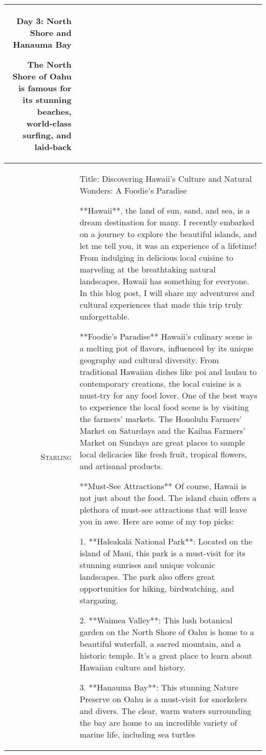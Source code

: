\documentclass{article}
\newlength\mydepth
\newcommand{\starlingemojititle}{\textsc{Starling}\raisebox{-\mydepth}{\texttt{[image: images/starling-final.png]}}}
\begin{document}
{{\begin{tabularx}{\linewidth}{r X}
Day 3: North Shore and Hanauma Bay

The North Shore of Oahu is famous for its stunning beaches, world-class surfing, and laid-back

\\
 \midrule \starlingemojititle{}  &
Title: Discovering Hawaii's Culture and Natural Wonders: A Foodie's Paradise

**Hawaii**, the land of sun, sand, and sea, is a dream destination for many. I recently embarked on a journey to explore the beautiful islands, and let me tell you, it was an experience of a lifetime! From indulging in delicious local cuisine to marveling at the breathtaking natural landscapes, Hawaii has something for everyone. In this blog post, I will share my adventures and cultural experiences that made this trip truly unforgettable.

**Foodie's Paradise**
Hawaii's culinary scene is a melting pot of flavors, influenced by its unique geography and cultural diversity. From traditional Hawaiian dishes like poi and laulau to contemporary creations, the local cuisine is a must-try for any food lover. One of the best ways to experience the local food scene is by visiting the farmers' markets. The Honolulu Farmers' Market on Saturdays and the Kailua Farmers' Market on Sundays are great places to sample local delicacies like fresh fruit, tropical flowers, and artisanal products.

**Must-See Attractions**
Of course, Hawaii is not just about the food. The island chain offers a plethora of must-see attractions that will leave you in awe. Here are some of my top picks:

1. **Haleakalā National Park**: Located on the island of Maui, this park is a must-visit for its stunning sunrises and unique volcanic landscapes. The park also offers great opportunities for hiking, birdwatching, and stargazing.

2. **Waimea Valley**: This lush botanical garden on the North Shore of Oahu is home to a beautiful waterfall, a sacred mountain, and a historic temple. It's a great place to learn about Hawaiian culture and history.

3. **Hanauma Bay**: This stunning Nature Preserve on Oahu is a must-visit for snorkelers and divers. The clear, warm waters surrounding the bay are home to an incredible variety of marine life, including sea turtles

\\
 \bottomrule
 \end{tabularx} }

}
\end{document}

